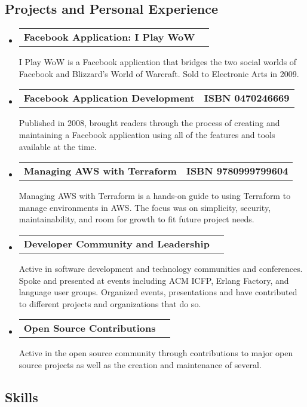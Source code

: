 \documentclass[10pt,letterpaper]{article}
\makeatletter
\newcommand{\headerrow}[2]
{\begin{tabular*}{\linewidth}{l@{\extracolsep{\fill}}r}
  #1 &
  #2 \\
\end{tabular*}}
\makeatother
\begin{document}
\vspace{-0.4em}
\subsection*{Projects and Personal Experience}

\begin{itemize}
  \parskip=0.1em

  \item
  \headerrow
    {\textbf{Facebook Application: I Play WoW}}
    {\textbf{}}
    I Play WoW is a Facebook application that bridges the two social worlds of Facebook and Blizzard's World of Warcraft. Sold to Electronic Arts in 2009.
  \item
  \headerrow
    {\textbf{Facebook Application Development}}
    {\textbf{ISBN 0470246669}}
    Published in 2008, brought readers through the process of creating and maintaining a Facebook application using all of the features and tools available at the time.
  \item
  \headerrow
    {\textbf{Managing AWS with Terraform}}
    {\textbf{ISBN 9780999799604}}
    Managing AWS with Terraform is a hands-on guide to using Terraform to manage environments in AWS. The focus was on simplicity, security, maintainability, and room for growth to fit future project needs.
  \item
  \headerrow
    {\textbf{Developer Community and Leadership}}
    {\textbf{}}
    Active in software development and technology communities and conferences. Spoke and presented at events including ACM ICFP, Erlang Factory, and language user groups. Organized events, presentations and have contributed to different projects and organizations that do so.
  \item
  \headerrow
    {\textbf{Open Source Contributions}}
    {\textbf{}}
    Active in the open source community through contributions to major open source projects as well as the creation and maintenance of several.
\end{itemize}

\vspace{-0.4em}
\subsection*{Skills}
\end{document}
